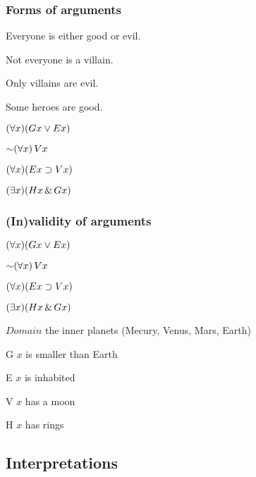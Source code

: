 \begin{frame}
\frametitle{Forms of arguments}

\begin{earg}
  \item[] Everyone is either good or evil.
  \item[] Not everyone is a villain.
  \item[] Only villains are evil.
  \item[\therefore] Some heroes are good.
\end{earg}

\begin{earg}
\item[] $(\forall x)( Gx \vee  Ex)$
\item[] $\enot \qt{\forall}{x}\, V\qv{x}$
\item[] $(\forall x) (Ex \supset Vx)$
\item[\therefore] $(\exists x) (Hx \,\&\, Gx)$
\end{earg}

\end{frame}


\begin{frame}
\frametitle{(In)validity of arguments}

\begin{earg}
\item[] $(\forall x)( Gx \vee  Ex)$
\item[] $\enot \qt{\forall}{x}\, V\qv{x}$
\item[] $(\forall x) (Ex \supset Vx)$
\item[\therefore] $(\exists x) (Hx \,\&\, Gx)$
\end{earg}

\begin{ekey}
\item[$Domain$] the inner planets (Mecury, Venus, Mars, Earth)
\item[G\qv{x}] $x$ is smaller than Earth
\item[E\qv{x}] $x$ is inhabited
\item[V\qv{x}] $x$ has a moon
\item[H\qv{x}] $x$ has rings
\end{ekey}
\end{frame}

\subsection{Interpretations}


